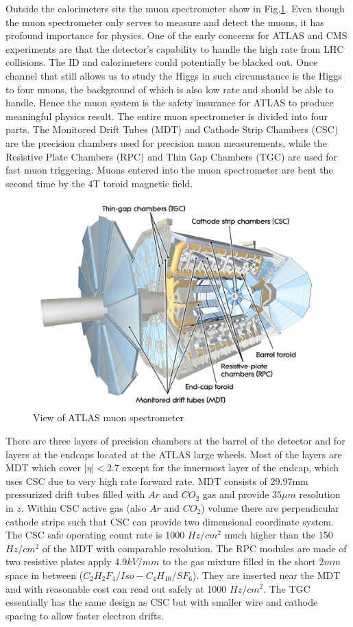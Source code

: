 \label{sec:detector-mu}
Outside the calorimeters sits the muon spectrometer show in Fig.\ref{fig:detector-mu}. Even though the muon spectrometer only serves to measure and detect the muons, it has profound importance for physics. One of the early concerns for ATLAS and CMS experiments are that the detector's capability to handle the high rate from LHC collisions. The ID and calorimeters could potentially be blacked out. Once channel that still allows us to study the Higgs in such circumstance is the Higgs to four muons, the background of which is also low rate and should be able to handle. Hence the muon system is the safety insurance for ATLAS to produce meaningful physics result. The entire muon spectrometer is divided into four parts. The Monitored Drift Tubes (MDT) and Cathode Strip Chambers (CSC) are the precision chambers used for precision muon measurements, while the Resistive Plate Chambers (RPC) and Thin Gap Chambers (TGC) are used for fast muon triggering. Muons entered into the muon spectrometer are bent the second time by the 4T toroid magnetic field. 

\begin{figure}[htpb!]
\begin{center}
  \includegraphics[width=0.8\linewidth]{figures/detector/muon}
\caption{View of ATLAS muon spectrometer}
\label{fig:detector-mu}
\end{center}
\end{figure}


There are three layers of precision chambers at the barrel of the detector and for layers at the endcaps located at the ATLAS large wheels. Most of the layers are MDT which cover $|\eta|<2.7$ except for the innermost layer of the endcap, which uses CSC due to very high rate forward rate. MDT consists of 29.97mm pressurized drift tubes filled with $Ar$ and $CO_2$ gas and provide $35\mu m$ resolution in $z$. Within CSC active gas (also $Ar$ and $CO_2$) volume there are perpendicular cathode strips such that CSC can provide two dimensional coordinate system. The CSC safe operating count rate is 1000 $Hz/cm^2$ much higher than the 150 $Hz/cm^2$ of the MDT with comparable resolution. The RPC modules are made of two resistive plates apply 4.9$kV/mm$ to the gas mixture filled in the short 2$mm$ space in between ($C_2H_2F_4/Iso-C_4H_{10}/SF_6$). They are inserted near the MDT and with reasonable cost can read out safely at 1000 $Hz/cm^2$. The TGC essentially has the same design as CSC but with smaller wire and cathode spacing to allow faster electron drifts. 


